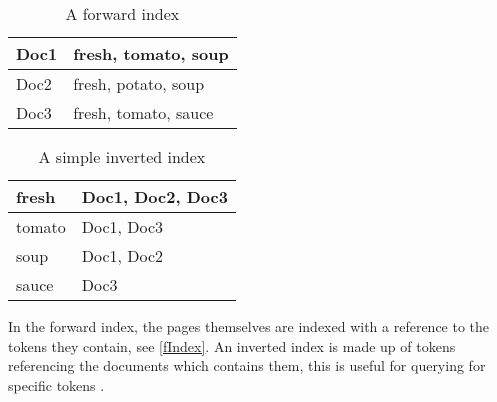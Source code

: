 \begin{minipage}{.40\textwidth}
  \centering
  \begin{table}[H]
	\centering
    \label{fIndex}
    \begin{tabular}{|l|l|}
\hline
Doc1 & fresh, tomato, soup \\ \hline
Doc2 & fresh, potato, soup \\ \hline
Doc3 & fresh, tomato, sauce \\ \hline
	\end{tabular}
	\caption{A forward index}
  \end{table}
\end{minipage}
\begin{minipage}{0.5\textwidth}
  \centering
  \begin{table}[H]
	\centering
    \label{iIndex}
    \begin{tabular}{|l|l|}
\hline
fresh & Doc1, Doc2, Doc3 \\ \hline
tomato & Doc1, Doc3 \\ \hline
soup & Doc1, Doc2 \\ \hline
sauce & Doc3 \\ \hline
	\end{tabular}
	\caption{A simple inverted index}
  \end{table}  
\end{minipage}

In the forward index, the pages themselves are indexed with a reference to the
tokens they contain, see \autoref{fIndex}. An inverted index is made up of
tokens referencing the documents which contains them, this is useful for
querying for specific tokens \citep{Index3}.






